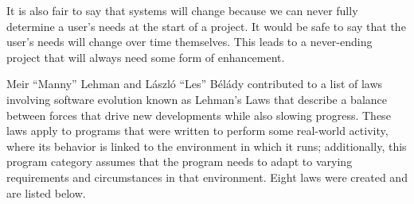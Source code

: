\documentclass[12pt,conference]{IEEEtran}
\begin{document}
It is also fair to say that systems will change because we can never fully determine a user's needs at the start of a project. It would be safe to say that the user's needs will change over time themselves. This leads to a never-ending project that will always need some form of enhancement.

Meir ``Manny'' Lehman and László ``Les'' Bélády contributed to a list of laws involving software evolution known as Lehman's Laws that describe a balance between forces that drive new developments while also slowing progress. These laws apply to programs that were written to perform some real-world activity, where its behavior is linked to the environment in which it runs; additionally, this program category assumes that the program needs to adapt to varying requirements and circumstances in that environment. Eight laws were created and are listed below. \cite{wiki:lehmans-laws}
\end{document}
